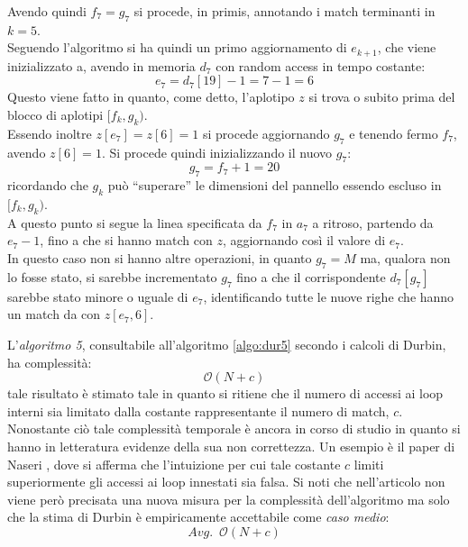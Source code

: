 \begin{esempio}
  Avendo quindi $f_7=g_7$ si procede, in primis, annotando i match terminanti in
  $k=5$.\\
  Seguendo l'algoritmo si ha quindi un primo aggiornamento di $e_{k+1}$, che
  viene inizializzato a, avendo in memoria $d_7$ con random access in tempo
  costante: 
  \[e_7=d_7[19]-1=7-1=6\]
  Questo viene fatto in quanto, come detto, l'aplotipo $z$ si trova o subito
  prima del blocco di aplotipi $[f_k,g_k)$.\\
  Essendo inoltre $z[e_7]=z[6]=1$ si procede aggiornando $g_7$ e tenendo fermo
  $f_7$, avendo $z[6]=1$. Si procede quindi inizializzando il
  nuovo $g_7$:
  \[g_7=f_7+1=20\]
  ricordando che $g_k$ può ``superare'' le dimensioni del pannello essendo
  escluso in $[f_k,g_k)$.\\
  A questo punto si segue la linea specificata da $f_7$ in $a_7$ a ritroso,
  partendo da $e_7-1$, fino a che si hanno match con $z$, aggiornando così il
  valore di $e_7$.\\
  In questo caso non si hanno altre operazioni, in quanto $g_7=M$ ma, qualora
  non lo fosse stato, si sarebbe incrementato $g_7$ fino a che il corrispondente
  $d_7[g_7]$ sarebbe stato minore o uguale di $e_7$, identificando tutte le
  nuove righe che hanno un match da con $z[e_7, 6]$.
\end{esempio}
L'\textit{algoritmo 5}, consultabile all'algoritmo \ref{algo:dur5} secondo i
calcoli di Durbin, ha complessità:
\begin{equation}
  \label{eq:pbwtsmem5}
  \mathcal{O}(N+c)
\end{equation}
tale risultato è stimato tale in quanto si ritiene che il
numero di accessi ai loop interni sia limitato dalla costante rappresentante il
numero di match, $c$. Nonostante ciò tale complessità temporale è ancora in
corso di studio in quanto si hanno in letteratura evidenze della sua non
correttezza. Un esempio è il paper di Naseri \cite{dpbwt}, dove si afferma che
l'intuizione per cui tale costante $c$ limiti superiormente gli accessi ai loop
innestati sia falsa. Si noti che nell'articolo non viene però precisata una
nuova misura per la complessità dell'algoritmo ma solo che la stima di Durbin è
empiricamente accettabile come \textit{caso medio}:
\begin{equation}
  \label{eq:pbwtsmem6}
  Avg.\,\,\,\mathcal{O}(N+c)
\end{equation}

